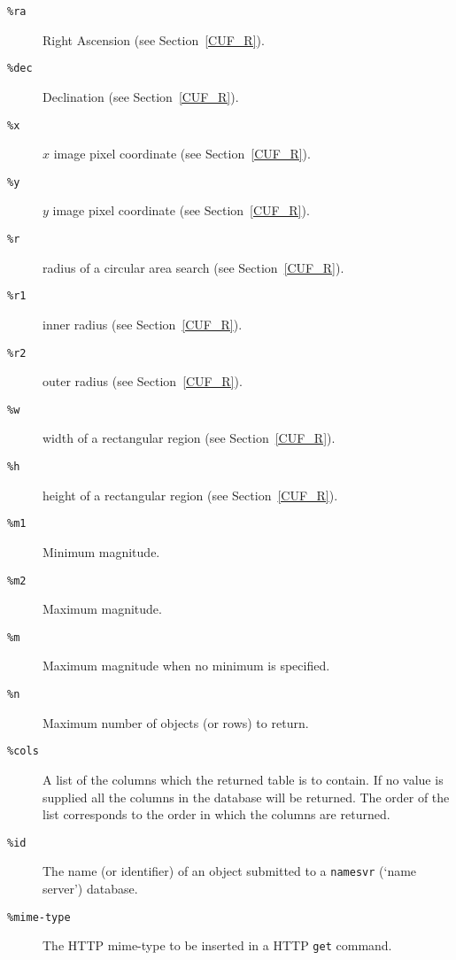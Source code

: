 \documentclass[twoside,11pt,nolof,chapters]{starlink}
\begin{document}
\begin{description}

  \item[\texttt{\%ra}] Right Ascension (see Section~\ref{CUF_R}).

  \item[\texttt{\%dec}] Declination (see Section~\ref{CUF_R}).

  \item[\texttt{\%x}] $x$\/ image pixel coordinate (see Section~\ref{CUF_R}).

  \item[\texttt{\%y}] $y$\/ image pixel coordinate (see Section~\ref{CUF_R}).

  \item[\texttt{\%r}] radius of a circular area search (see Section~\ref{CUF_R}).

  \item[\texttt{\%r1}] inner radius (see Section~\ref{CUF_R}).

  \item[\texttt{\%r2}] outer radius (see Section~\ref{CUF_R}).

  \item[\texttt{\%w}] width of a rectangular region (see Section~\ref{CUF_R}).

  \item[\texttt{\%h}] height of a rectangular region (see Section~\ref{CUF_R}).

  \item[\texttt{\%m1}] Minimum magnitude.

  \item[\texttt{\%m2}] Maximum magnitude.

  \item[\texttt{\%m}] Maximum magnitude when no minimum is specified.

  \item[\texttt{\%n}] Maximum number of objects (or rows) to return.

  \item[\texttt{\%cols }] A list of the columns which the returned table
   is to contain.  If no value is supplied all the columns in the
   database will be returned.  The order of the list corresponds to the
   order in which the columns are returned.

  \item[\texttt{\%id }] The name (or identifier) of an object submitted to
   a \texttt{namesvr} (`name server') database.

  \item[\texttt{\%mime-type}] The HTTP mime-type to be inserted in a HTTP
   \texttt{get} command.


\end{description}
\end{document}
